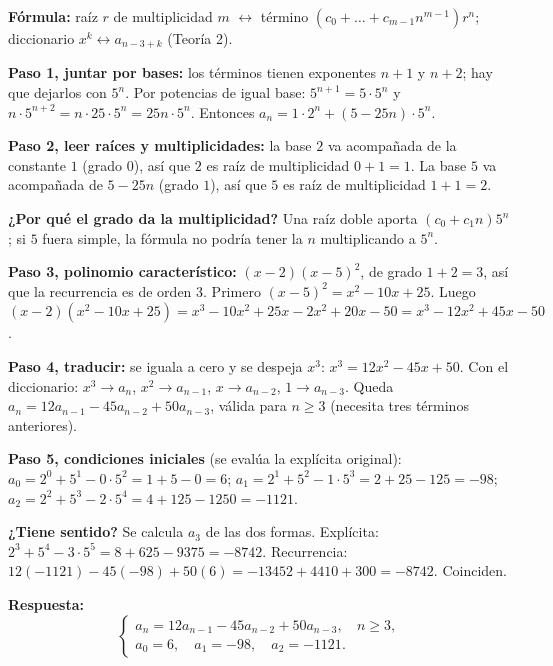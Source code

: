 \documentclass[11pt]{article}
\begin{document}
\begin{explica}
\textbf{Fórmula:} raíz $r$ de multiplicidad $m$ $\leftrightarrow$ término $(c_0+\dots+c_{m-1}n^{m-1})r^n$; diccionario $x^k\leftrightarrow a_{n-3+k}$ (Teoría 2).

\textbf{Paso 1, juntar por bases:} los términos tienen exponentes $n+1$ y $n+2$; hay que dejarlos con $5^n$. Por potencias de igual base: $5^{n+1}=5\cdot 5^n$ y $n\cdot 5^{n+2}=n\cdot 25\cdot 5^n=25n\cdot 5^n$. Entonces $a_n=1\cdot 2^n+(5-25n)\cdot 5^n$.

\textbf{Paso 2, leer raíces y multiplicidades:} la base $2$ va acompañada de la constante $1$ (grado $0$), así que $2$ es raíz de multiplicidad $0+1=1$. La base $5$ va acompañada de $5-25n$ (grado $1$), así que $5$ es raíz de multiplicidad $1+1=2$.

\textbf{¿Por qué el grado da la multiplicidad?} Una raíz doble aporta $(c_0+c_1n)5^n$; si $5$ fuera simple, la fórmula no podría tener la $n$ multiplicando a $5^n$.

\textbf{Paso 3, polinomio característico:} $(x-2)(x-5)^2$, de grado $1+2=3$, así que la recurrencia es de orden 3. Primero $(x-5)^2=x^2-10x+25$. Luego $(x-2)(x^2-10x+25)=x^3-10x^2+25x-2x^2+20x-50=x^3-12x^2+45x-50$.

\textbf{Paso 4, traducir:} se iguala a cero y se despeja $x^3$: $x^3=12x^2-45x+50$. Con el diccionario: $x^3\to a_n$, $x^2\to a_{n-1}$, $x\to a_{n-2}$, $1\to a_{n-3}$. Queda $a_n=12a_{n-1}-45a_{n-2}+50a_{n-3}$, válida para $n\ge 3$ (necesita tres términos anteriores).

\textbf{Paso 5, condiciones iniciales} (se evalúa la explícita original):
$a_0=2^0+5^1-0\cdot 5^2=1+5-0=6$;\quad
$a_1=2^1+5^2-1\cdot 5^3=2+25-125=-98$;\quad
$a_2=2^2+5^3-2\cdot 5^4=4+125-1250=-1121$.

\textbf{¿Tiene sentido?} Se calcula $a_3$ de las dos formas. Explícita: $2^3+5^4-3\cdot 5^5=8+625-9375=-8742$. Recurrencia: $12(-1121)-45(-98)+50(6)=-13452+4410+300=-8742$. Coinciden.
\end{explica}

\textbf{Respuesta:}
\[
\begin{cases}
a_n=12a_{n-1}-45a_{n-2}+50a_{n-3}, & n\ge 3,\\
a_0=6,\quad a_1=-98,\quad a_2=-1121.
\end{cases}
\]

\clearpage
\end{document}
